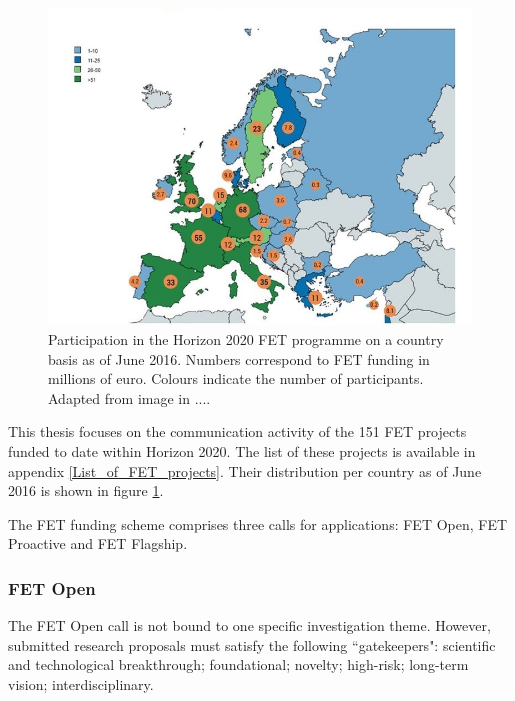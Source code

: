 \begin{figure}[!t] 
 \begin{center}
 \includegraphics[scale=0.3]{Images/Country_participation_in_H2020_FET_projects.jpg}
 \caption{Participation in the Horizon 2020 FET programme on a country basis as of June 2016. Numbers correspond to FET funding in millions of euro. Colours indicate the number of participants. Adapted from image in ....}
 \label{Country_participation_in_H2020_FET_projects}
 \end{center}
\end{figure}


This thesis focuses on the communication activity of the 151 FET projects funded to date within Horizon 2020. The list of these projects is available in appendix \ref{List_of_FET_projects}. Their distribution per country as of June 2016 is shown in figure \ref{Country_participation_in_H2020_FET_projects}.

The FET funding scheme comprises three calls for applications: FET Open, FET Proactive and FET Flagship.

\subsubsection{FET Open}
The FET Open call is not bound to one specific investigation theme. However, submitted research proposals must satisfy the following ``gatekeepers": scientific and technological breakthrough; foundational; novelty; high-risk; long-term vision; interdisciplinary. 

